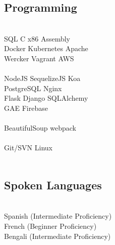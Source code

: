 \documentclass[]{deedy-resume-openfont}
\begin{document}
\begin{minipage}[t]{0.31\textwidth}
\subsection{Programming}
\\[1\baselineskip]

SQL \textbullet{}   C \textbullet{} x86 Assembly
\\[1\baselineskip]

Docker \textbullet{} Kubernetes \textbullet{} Apache \\
Wercker \textbullet{} Vagrant \textbullet{} AWS \\
\\[1\baselineskip]

NodeJS \textbullet{} SequelizeJS \textbullet{} Koa\\
PostgreSQL \textbullet{} Nginx \\
Flask \textbullet{} Django \textbullet{} SQLAlchemy \\
GAE \textbullet{} Firebase \\
\\[1\baselineskip]

BeautifulSoup \textbullet{} webpack \\
\\[1\baselineskip]




Git/SVN \textbullet{} Linux \\
\\[1\baselineskip]

\sectionsep


\subsection{Spoken Languages}
\\[1\baselineskip]
Spanish (Intermediate Proficiency) \\
French (Beginner Proficiency)\\
Bengali (Intermediate Proficiency)


%
%

\end{minipage}
\end{document}
